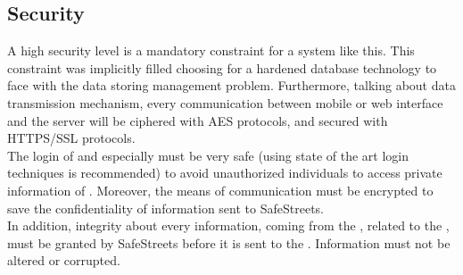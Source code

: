 \documentclass[../../../RASD.tex]{subfiles}
\begin{document}
\subsection{Security\label{sect:3.5.3}}

A high security level is a mandatory constraint for a system like this. This constraint was implicitly filled choosing for a hardened database technology to face with the data storing management problem. Furthermore, talking about data transmission mechanism, every communication between mobile or web interface and the server will be ciphered with AES protocols, and secured with HTTPS/SSL protocols. 
\\
The login of  and especially must be very safe (using state of the art login techniques is recommended) to avoid unauthorized individuals to access private information of . Moreover, the means of communication must be encrypted to save the confidentiality of information sent to SafeStreets. 
\\
In addition, integrity about every information, coming from the , related to the , must be granted by SafeStreets before it is sent to the . Information must not be altered or corrupted. 
\end{document}
